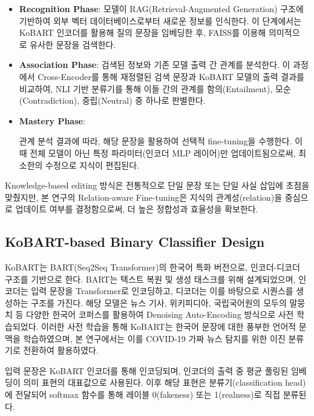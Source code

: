 \documentclass[a4paper,fleqn]{cas-sc}
\begin{document}
\begin{itemize}
    \item{\textbf{Recognition Phase}:
    모델이 RAG(Retrieval-Augmented Generation) 구조에 기반하여 외부 벡터 데이터베이스로부터 새로운 정보를 인식한다.  
    이 단계에서는 KoBART 인코더를 활용해 질의 문장을 임베딩한 후, FAISS를 이용해 의미적으 로 유사한 문장을 검색한다.}
    
    \item{\textbf{Association Phase}:
    검색된 정보와 기존 모델 출력 간 관계를 분석한다. 이 과정에서 Cross-Encoder를 통해 재정렬된 검색 문장과 KoBART 모델의 출력 결과를 비교하여, NLI 기반 분류기를 통해 이들 간의 관계를 함의(Entailment), 모순(Contradiction), 중립(Neutral) 중 하나로 판별한다.}
    
    \item{\textbf{Mastery Phase}:
    
    관계 분석 결과에 따라, 해당 문장을 활용하여 선택적 fine-tuning을 수행한다. 이때 전체 모델이 아닌 특정 파라미터(인코더 MLP 레이어)만 업데이트됨으로써, 최소한의 수정으로 지식이 편집된다.
    }

\end{itemize}  

Knowledge-based editing 방식은 전통적으로 단일 문장 또는 단일 사실 삽입에 초점을 맞췄지만, 본 연구의 Relation-aware Fine-tuning은 지식의 관계성(relation)을 중심으로 업데이트 여부를 결정함으로써, 더 높은 정합성과 효율성을 확보한다. 




\subsection{KoBART-based Binary Classifier Design}

KoBART는 BART(Seq2Seq Transformer)의 한국어 특화 버전으로, 인코더-디코더 구조를 기반으로 한다. 
BART는 텍스트 복원 및 생성 태스크를 위해 설계되었으며, 인코더는 입력 문장을 Transformer로 인코딩하고, 디코더는 이를 바탕으로 시퀀스를 생성하는 구조를 가진다. 
해당 모델은 뉴스 기사, 위키피디아, 국립국어원의 모두의 말뭉치 등 다양한 한국어 코퍼스를 활용하여 Denoising Auto-Encoding 방식으로 사전 학습되었다. 
이러한 사전 학습을 통해 KoBART는 한국어 문장에 대한 풍부한 언어적 문맥을 학습하였으며, 본 연구에서는 이를 COVID-19 가짜 뉴스 탐지를 위한 이진 분류기로 전환하여 활용하였다.

입력 문장은 KoBART 인코더를 통해 인코딩되며, 인코더의 출력 중 평균 풀링된 임베딩이 의미 표현의 대표값으로 사용된다.
이후 해당 표현은 분류기(classification head)에 전달되어 softmax 함수를 통해 레이블 0(fakeness) 또는 1(realness)로 직접 분류된다. 
\end{document}
